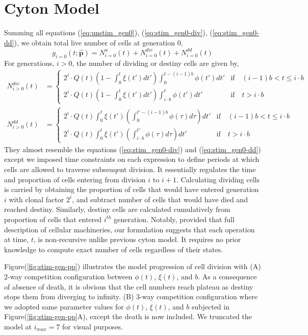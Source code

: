 \documentclass{article}
\newcommand{\enterProblemHeader}[1]{
    }
\newcommand{\exitProblemHeader}[1]{
    }
\newcounter{homeworkProblemCounter} %
\newcommand{\homeworkProblemName}{}
\newenvironment{homeworkProblem}[1][Problem \arabic{homeworkProblemCounter}]{ %
    \stepcounter{homeworkProblemCounter} %
    \renewcommand{\homeworkProblemName}{#1} %
    \section{\homeworkProblemName} %
    \enterProblemHeader{\homeworkProblemName} %
    }{
    \exitProblemHeader{\homeworkProblemName} %
    }
\begin{document}
\begin{homeworkProblem}[Cyton Model]
        Summing all equations (\ref{eq:unstim_gen0}), (\ref{eq:stim_gen0-div}), (\ref{eq:stim_gen0-dd}), we obtain total live number of cells at generation 0,
        \begin{equation} \label{eq:g_gen0}
            g_{i=0}(t;\mathbf{\hat{p}}) = N_{i=0}^u(t) + N_{i=0}^{div}(t) + N_{i=0}^{dd}(t)
        \end{equation}
        For generations, $i>0$, the number of dividing or destiny cells are given by,
        \begin{align}
            N_{i>0}^{div}(t) & = 
            \begin{cases}
                2^i \cdot Q(t) \left(1 - \int_0^t \xi(t')dt'\right) \int_0^{t-(i-1)b} \phi(t')dt' & \mathrm{if} \quad (i-1)b < t \leq i \cdot b \\
                2^i \cdot Q(t) \left(1 - \int_0^t \xi(t')dt' \right) \int_{i\cdot b}^t \phi(t')dt' & \mathrm{if} \quad  t > i \cdot b
            \end{cases} \\
            N_{i>0}^{dd}(t) & =
            \begin{cases}
                2^i \cdot Q(t) \int_0^t \xi(t') \left(\int_0^{t'-(i-1)b}\phi(\tau)d\tau\right)dt' & \mathrm{if} \quad (i-1)b < t \leq i \cdot b \\
                2^i \cdot Q(t) \int_0^t \xi(t') \left(\int_{i\cdot b}^{t'}\phi(\tau)d\tau\right)dt' & \mathrm{if} \quad t > i\cdot b
            \end{cases}
        \end{align}
        They almost resemble the equations (\ref{eq:stim_gen0-div}) and (\ref{eq:stim_gen0-dd}) except we imposed time constraints on each expression to define periods at which cells are allowed to traverse subseuqent division. It essentially regulates the time and proportion of cells entering from division $i$ to $i+1$. Calculating dividing cells is carried by obtaining the proportion of cells that would have entered generation $i$ with clonal factor $2^i$, and subtract number of cells that would have died and reached destiny. Similarly, destiny cells are calculated cumulatively from proportion of cells that entered $i^{th}$ generation. Notably, provided that full description of cellular machineries, our formulation suggests that each operation at time, $t$, is non-recursive unlike previous cyton model. It requires no prior knowledge to compute exact number of cells regardless of their states.

        Figure(\ref{fig:stim-gen-pp}) illustrates the model progression of cell division with (A) 2-way competition configuration between $\phi(t)$, $\xi(t)$, and $b$. As a consequence of absence of death, it is obvious that the cell numbers reach plateau as destiny stops them from diverging to infinity. (B) 3-way competition configuration where we adopted same parameter values for $\phi(t)$, $\xi(t)$, and $b$ subjected in Figure(\ref{fig:stim-gen-pp}A), except the death is now included. We truncated the model at $i_{max} = 7$ for visual purposes.


\end{homeworkProblem}
\end{document}
